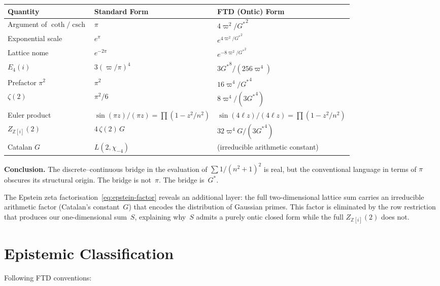 \documentclass[12pt]{article}
\newcommand{\Z}{\mathbb{Z}}
\DeclareMathOperator{\csch}{csch}
\begin{document}
\begin{center}
\begin{tabular}{lll}
\toprule
\textbf{Quantity} & \textbf{Standard Form} & \textbf{FTD (Ontic) Form}\\
\midrule
Argument of $\coth/\csch$ & $\pi$ & $4\varpi^2/{G^{*}}^2$\\
Exponential scale & $e^{\pi}$ & $e^{4\varpi^2/{G^{*}}^2}$\\
Lattice nome & $e^{-2\pi}$ & $e^{-8\varpi^2/{G^{*}}^2}$\\
$E_4(i)$ & $3(\varpi/\pi)^4$ & $3{G^{*}}^8/(256\varpi^4)$\\
Prefactor $\pi^2$ & $\pi^2$ & $16\varpi^4/{G^{*}}^4$\\
$\zeta(2)$ & $\pi^2/6$ & $8\varpi^4/(3{G^{*}}^4)$\\
Euler product & $\sin(\pi z)/(\pi z) = \prod(1-z^2/n^2)$ & $\sin(4\ell z)/(4\ell z) = \prod(1-z^2/n^2)$\\
$Z_{\Z[i]}(2)$ & $4\,\zeta(2)\,G$ & $32\varpi^4 G/(3{G^{*}}^4)$\\
Catalan $G$ & $L(2,\chi_{-4})$ & (irreducible arithmetic constant)\\
\bottomrule
\end{tabular}
\end{center}
\medskip

\noindent\textbf{Conclusion.}
The discrete--continuous bridge in the evaluation of
$\sum 1/(n^2+1)^2$ is real, but the conventional language in terms of
$\pi$ obscures its structural origin.  The bridge is not~$\pi$.  The
bridge is~${G^{*}}$.

The Epstein zeta factorisation~\eqref{eq:epstein-factor} reveals an
additional layer: the full two-dimensional lattice sum carries an
irreducible arithmetic factor (Catalan's constant~$G$) that encodes the
distribution of Gaussian primes.  This factor is eliminated by the row
restriction that produces our one-dimensional sum~$S$, explaining why~$S$
admits a purely ontic closed form while the full $Z_{\Z[i]}(2)$ does not.

\section*{Epistemic Classification}

Following FTD conventions:
\end{document}
